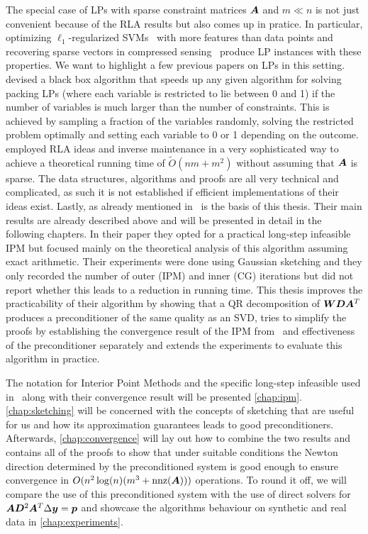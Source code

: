 The special case of LPs with sparse constraint matrices \(\bm{A}\) and \(m \ll n\) is not just convenient because of the RLA results but also comes up in pratice.
In particular, optimizing \(\ell_1\)-regularized SVMs~\cite{ZhuRossetTibshiraniHastie-1normSupportVectorMachines} with more features than data points and recovering sparse vectors in compressed sensing~\cite{YangZhang-l1ProblemsInCompressiveSensing} produce LP instances with these properties.
We want to highlight a few previous papers on LPs in this setting. \textcite{LondonVardiWiermanYi-PackingLinearPrograms} devised a black box algorithm that speeds up any given algorithm for solving packing LPs (where each variable is restricted to lie between 0 and 1) if the number of variables is much larger than the number of constraints.
This is achieved by sampling a fraction of the variables randomly, solving the restricted problem optimally and setting each variable to 0 or 1 depending on the outcome.
\textcite{Sidford-TallDenseLinearPrograms} employed RLA ideas and inverse maintenance in a very sophisticated way to achieve a theoretical running time of \(\tilde{O}(nm + m^2)\) without assuming that \(\bm{A}\) is sparse.
The data structures, algorithms and proofs are all very technical and complicated, as such it is not established if efficient implementations of their ideas exist.
Lastly, as already mentioned in~\cite{Avron-FasterRandomizedInfeasibleIPMs} is the basis of this thesis.
Their main results are already described above and will be presented in detail in the following chapters.
In their paper they opted for a practical long-step infeasible IPM but focused mainly on the theoretical analysis of this algorithm assuming exact arithmetic.
Their experiments were done using Gaussian sketching and they only recorded the number of outer (IPM) and inner (CG) iterations but did not report whether this leads to a reduction in running time.
This thesis improves the practicability of their algorithm by showing that a QR decomposition of \(\bm{W} \bm{D} \bm{A}^T\) produces a preconditioner of the same quality as an SVD, tries to simplify the proofs by establishing the convergence result of the IPM from~\cite{Monteiro-ConvergenceAnalysisLongStepInfeasibleIPMs} and effectiveness of the preconditioner separately and extends the experiments to evaluate this algorithm in practice.

The notation for Interior Point Methods and the specific long-step infeasible used in~\cite{Monteiro-ConvergenceAnalysisLongStepInfeasibleIPMs} along with their convergence result will be presented \cref{chap:ipm}.
\cref{chap:sketching} will be concerned with the concepts of sketching that are useful for us and how its approximation guarantees leads to good preconditioners.
Afterwards, \cref{chap:convergence} will lay out how to combine the two results and contains all of the proofs to show that under suitable conditions the Newton direction determined by the preconditioned system is good enough to ensure convergence in \(O(n^2 \log(n) (m^3 + \operatorname{nnz}(\bm{A})))\) operations.
To round it off, we will compare the use of this preconditioned system with the use of direct solvers for \(\bm{A}\bm{D}^2\bm{A}^T \Delta \bm{y} = \bm{p}\) and showcase the algorithms behaviour on synthetic and real data in \cref{chap:experiments}.
